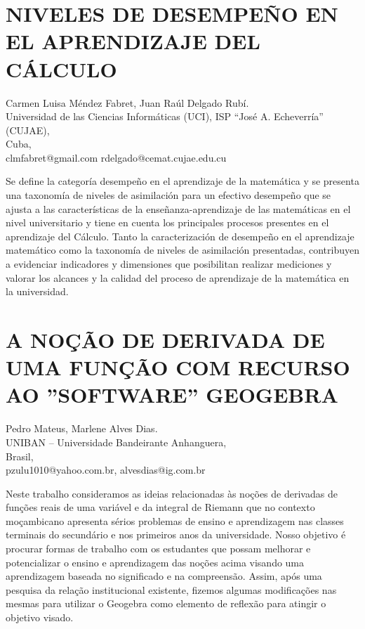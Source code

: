 \section{NIVELES DE DESEMPEÑO EN EL APRENDIZAJE DEL CÁLCULO}

\begin{datos}
Carmen Luisa Méndez Fabret, Juan Raúl Delgado Rubí.\\
Universidad de las Ciencias Informáticas (UCI), ISP “José A. Echeverría” (CUJAE),\\
\hfill Cuba, \\
\hfill clmfabret@gmail.com rdelgado@cemat.cujae.edu.cu
\end{datos}

Se define la categoría desempeño en el aprendizaje de la matemática
y se presenta una taxonomía de niveles de asimilación para un efectivo
desempeño que se ajusta a las características de la enseñanza-aprendizaje
de las matemáticas en el nivel universitario y tiene en cuenta los
principales procesos presentes en el aprendizaje del Cálculo. Tanto
la caracterización de desempeño en el aprendizaje matemático como
la taxonomía de niveles de asimilación presentadas, contribuyen a
evidenciar indicadores y dimensiones que posibilitan realizar mediciones
y valorar los alcances y la calidad del proceso de aprendizaje de
la matemática en la universidad. 


\section{\uppercase{ a noção de derivada de uma função com recurso ao ''software''
geogebra }}

\begin{datos}
Pedro Mateus, Marlene Alves Dias.\\
UNIBAN – Universidade Bandeirante Anhanguera,\\
\hfill Brasil, \\
\hfill pzulu1010@yahoo.com.br, alvesdias@ig.com.br
\end{datos}

Neste trabalho consideramos as ideias relacionadas às noções de derivadas
de funções reais de uma variável e da integral de Riemann que no contexto
moçambicano apresenta sérios problemas de ensino e aprendizagem nas
classes terminais do secundário e nos primeiros anos da universidade.
Nosso objetivo é procurar formas de trabalho com os estudantes que
possam melhorar e potencializar o ensino e aprendizagem das noções
acima visando uma aprendizagem baseada no significado e na compreensão.
Assim, após uma pesquisa da relação institucional existente, fizemos
algumas modificações nas mesmas para utilizar o Geogebra como elemento
de reflexão para atingir o objetivo visado. 


